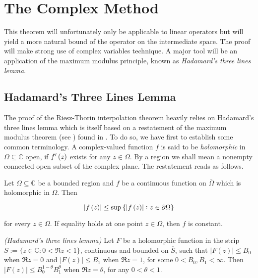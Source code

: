 \section{The Complex Method}
This theorem will unfortunately only be applicable to linear operators but will yield a more natural bound of the operator on the intermediate space. The proof will make strong use of complex variables technique. A major tool will be an application of the maximum modulus principle, known as \emph{Hadamard's three lines lemma}.

\subsection{Hadamard's Three Lines Lemma}
The proof of the Riesz-Thorin interpolation theorem heavily relies on Hadamard's three lines lemma which is itself based on a restatement of the maximum modulus theorem (see \cite[212]{rudin:rc_analysis:1987}) found in \cite[253]{rudin:rc_analysis:1987}. To do so, we have first to establish some common terminology. A complex-valued function $f$ is said to be \emph{holomorphic} in $\Omega \subseteq \mathbb{C}$ open, if $f'\del{z}$ exists for any $z \in \Omega$. By a region we shall mean a nonempty connected open subset of the complex plane. The restatement reads as follows.

\begin{theorem*}
	Let $\Omega \subseteq \mathbb{C}$ be a bounded region and $f$ be a continuous function on $\overline{\Omega}$ which is holomorphic in $\Omega$. Then 

	\begin{equation*}
		\abs[0]{f\del{z}} \leq \sup\cbr[0]{ \abs[0]{f\del{z}} : z \in \partial\Omega}
	\end{equation*}

	\noindent for every $z \in \Omega$. If equality holds at one point $z \in \Omega$, then $f$ is constant.
\end{theorem*}

\begin{mdframed}
	\begin{lemma}\emph{(Hadamard's three lines lemma)}
		Let $F$ be a holomorphic function in the strip $S := \{z \in \mathbb{C}: 0 < \Re z < 1\}$, continuous and bounded on $\overline{S}$, such that $\left| F(z)\right| \leq B_0$ when $\Re z = 0$ and $\left| F(z) \right| \leq B_1$ when $\Re z = 1$, for some $0 < B_0,B_1 < \infty$. Then $\left| F(z) \right| \leq B_0^{1 - \theta}B_1^\theta$ when $\Re z = \theta$, for any $0 < \theta < 1$.
		\label{lem:HTL}
	\end{lemma}
\end{mdframed}

